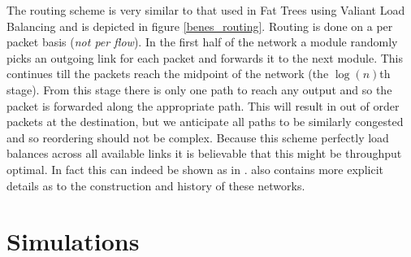 \documentclass{IEEEtran}%
\begin{document}
The routing scheme is very similar to that used in Fat Trees using Valiant Load Balancing \cite{Fat_Trees} \cite{VLB} and is depicted in figure \ref{benes_routing}.  Routing is done on a per packet basis ({\it not per flow}).  In the first half of the network a module randomly picks an outgoing link for each packet and forwards it to the next module.  This continues till the packets reach the midpoint of the network (the $\log(n)$th stage).  From this stage there is only one path to reach any output and so the packet is forwarded along the appropriate path.  This will result in out of order packets at the destination, but we anticipate all paths to be similarly congested and so reordering should not be complex.   Because this scheme perfectly load balances across all available links it is believable that this might be throughput optimal.  In fact this can indeed be shown as in \cite{Walrand_Varaiya}.  \cite{Walrand_Varaiya} also contains more explicit details as to the construction and history of these networks.


\section{Simulations}
%
\end{document}
